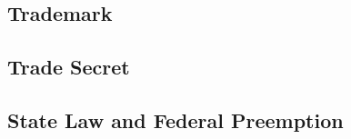 \subsection{Trademark}


\subsection{Trade Secret}


\subsection{State Law and Federal Preemption}

